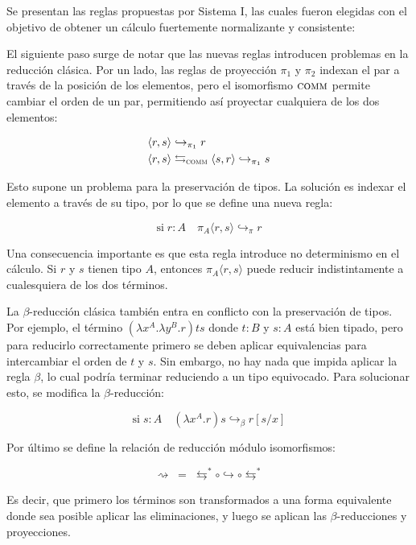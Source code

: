 \documentclass[]{report}
\begin{document}
	Se presentan las reglas propuestas por Sistema I, las cuales fueron elegidas con el objetivo de obtener un cálculo fuertemente normalizante y consistente:
	
	
	El siguiente paso surge de notar que las nuevas reglas introducen problemas en la reducción clásica.
	Por un lado, las reglas de proyección $\pi_1$ y $\pi_2$ indexan el par a través de la posición de los elementos, pero el isomorfismo $\textsc{comm}$ permite cambiar el orden de un par, permitiendo así proyectar cualquiera de los dos elementos:
	
	\begin{align*}
		\langle r, s \rangle& \hookrightarrow_{\pi_1} r \\
		\langle r, s \rangle& \leftrightarrows_{\textsc{comm}} \langle s, r \rangle \hookrightarrow_{\pi_1} s
	\end{align*}
	
	Esto supone un problema para la preservación de tipos.
	La solución es indexar el elemento a través de su tipo, por lo que se define una nueva regla:
	
	\[ \text{si} \; r:A \quad \pi_A \langle r, s \rangle \hookrightarrow_{\pi} r \]
	
	Una consecuencia importante es que esta regla introduce no determinismo en el cálculo.
	Si $r$ y $s$ tienen tipo $A$, entonces $\pi_A \langle r, s \rangle$ puede reducir indistintamente a cualesquiera de los dos términos.
	
	
	La $\beta$-reducción clásica también entra en conflicto con la preservación de tipos.
	Por ejemplo, el término $(\lambda x^A . \lambda y^B . r)ts$ donde $t:B$ y $s:A$ está bien tipado, pero para reducirlo correctamente primero se deben aplicar equivalencias para intercambiar el orden de $t$ y $s$.
	Sin embargo, no hay nada que impida aplicar la regla $\beta$, lo cual podría terminar reduciendo a un tipo equivocado.
	Para solucionar esto, se modifica la $\beta$-reducción:
	
	\[ \text{si} \; s:A \quad (\lambda x^A.r) s \hookrightarrow_{\beta} r[s/x] \]
	
	Por último se define la relación de reducción módulo isomorfismos:
	
	\[ \rightsquigarrow \; = \; \leftrightarrows^* \circ \hookrightarrow \circ \leftrightarrows^* \]
	
	Es decir, que primero los términos son transformados a una forma equivalente donde sea posible aplicar las eliminaciones, y luego se aplican las $\beta$-reducciones y proyecciones.
	
\end{document}
